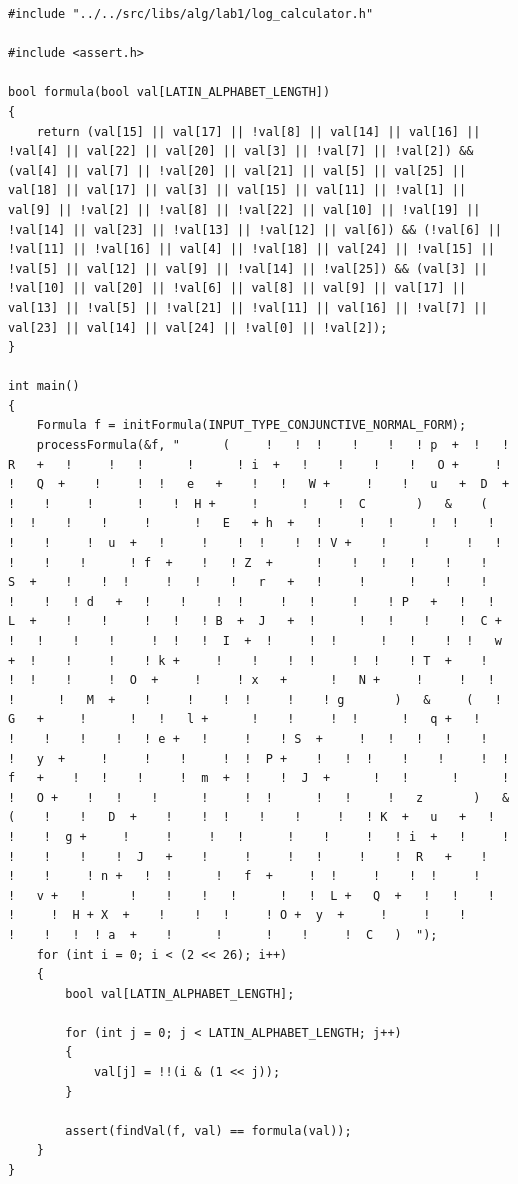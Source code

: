 \documentclass[a4paper,14pt]{extarticle}
\begin{document}
\begin{verbatim}
#include "../../src/libs/alg/lab1/log_calculator.h"

#include <assert.h>

bool formula(bool val[LATIN_ALPHABET_LENGTH])
{
    return (val[15] || val[17] || !val[8] || val[14] || val[16] || !val[4] || val[22] || val[20] || val[3] || !val[7] || !val[2]) && (val[4] || val[7] || !val[20] || val[21] || val[5] || val[25] || val[18] || val[17] || val[3] || val[15] || val[11] || !val[1] || val[9] || !val[2] || !val[8] || !val[22] || val[10] || !val[19] || !val[14] || val[23] || !val[13] || !val[12] || val[6]) && (!val[6] || !val[11] || !val[16] || val[4] || !val[18] || val[24] || !val[15] || !val[5] || val[12] || val[9] || !val[14] || !val[25]) && (val[3] || !val[10] || val[20] || !val[6] || val[8] || val[9] || val[17] || val[13] || !val[5] || !val[21] || !val[11] || val[16] || !val[7] || val[23] || val[14] || val[24] || !val[0] || !val[2]);
}

int main()
{
    Formula f = initFormula(INPUT_TYPE_CONJUNCTIVE_NORMAL_FORM);
    processFormula(&f, "      (     !   !  !    !    !   ! p  +  !   !   R   +   !     !   !      !      ! i  +   !    !    !    !   O +     !   !   Q  +    !     !  !   e   +    !   !   W +     !    !   u   +  D  +    !    !     !      !    !  H +     !      !    !  C       )   &    (     !  !    !    !     !      !   E   + h  +   !     !   !     !  !    !   !    !     !  u  +   !     !    !  !    !  ! V +    !     !     !   !    !    !    !      ! f  +    !   ! Z  +      !    !   !   !    !    !   S  +    !    !  !     !   !    !   r   +   !     !      !    !    !   !    !   ! d   +   !    !    !  !     !   !     !    ! P   +   !   !   L  +    !    !     !   !   ! B  +  J   +  !      !   !    !    !  C +   !   !    !    !     !  !   !  I  +  !     !  !      !   !    !  !   w   +  !    !     !    ! k +     !    !    !  !     !  !    ! T  +    !    !  !    !     !  O  +     !     ! x   +      !   N +     !     !   !   !      !   M  +    !     !    !  !     !    ! g       )   &     (   ! G   +     !      !   !   l +      !    !     !  !      !   q +   !    !    !    !    !   ! e +   !     !    ! S  +     !   !   !   !    !     !   y  +     !     !    !     !  !  P +    !   !  !    !    !     !  ! f   +    !   !    !     !  m  +  !    !  J  +      !   !      !      !  !   O +    !   !    !      !     !  !      !   !     !   z       )   &      (    !    !   D  +    !    !  !    !    !     !   ! K  +   u   +   !    !    !  g +     !     !     !   !      !    !     !   ! i  +   !     !      !    !    !    !  J   +    !     !     !   !     !    !  R   +    !    !    !     ! n +   !  !      !   f  +     !  !     !    !  !     !    !   v +   !      !    !    !   !      !   !  L +   Q  +   !   !    !      !     !  H + X  +    !    !   !     ! O +  y  +     !     !    !      !    !   !  ! a  +    !      !      !    !     !  C   )  ");
    for (int i = 0; i < (2 << 26); i++)
    {
        bool val[LATIN_ALPHABET_LENGTH];

        for (int j = 0; j < LATIN_ALPHABET_LENGTH; j++)
        {
            val[j] = !!(i & (1 << j));
        }

        assert(findVal(f, val) == formula(val));
    }
}
\end{verbatim}
\end{document}
